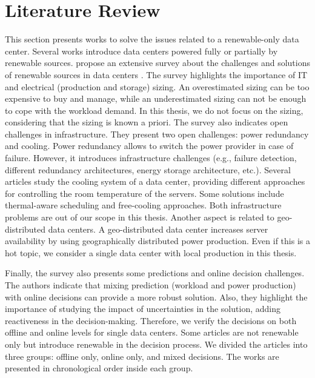 \section{Literature Review}
This section presents works to solve the issues related to a renewable-only data center. Several works introduce data centers powered fully or partially by renewable sources. \citeauthor{rostirolla2022survey} propose an extensive survey about the challenges and solutions of renewable sources in data centers \cite{rostirolla2022survey}. The survey highlights the importance of IT and electrical (production and storage) sizing. An overestimated sizing can be too expensive to buy and manage, while an underestimated sizing can not be enough to cope with the workload demand. In this thesis, we do not focus on the sizing, considering that the sizing is known a priori. The survey also indicates open challenges in infrastructure. They present two open challenges: power redundancy and cooling. Power redundancy allows to switch the power provider in case of failure. However, it introduces infrastructure challenges (e.g., failure detection, different redundancy architectures, energy storage architecture, etc.). Several articles study the cooling system of a data center, providing different approaches for controlling the room temperature of the servers. Some solutions include thermal-aware scheduling and free-cooling approaches. Both infrastructure problems are out of our scope in this thesis. Another aspect is related to geo-distributed data centers. A geo-distributed data center increases server availability by using geographically distributed power production. Even if this is a hot topic, we consider a single data center with local production in this thesis. 

Finally, the survey also presents some predictions and online decision challenges. The authors indicate that mixing prediction (workload and power production) with online decisions can provide a more robust solution. Also, they highlight the importance of studying the impact of uncertainties in the solution, adding reactiveness in the decision-making. Therefore, we verify the decisions on both offline and online levels for single data centers. Some articles are not renewable only but introduce renewable in the decision process. We divided the articles into three groups: offline only, online only, and mixed decisions. The works are presented in chronological order inside each group.

